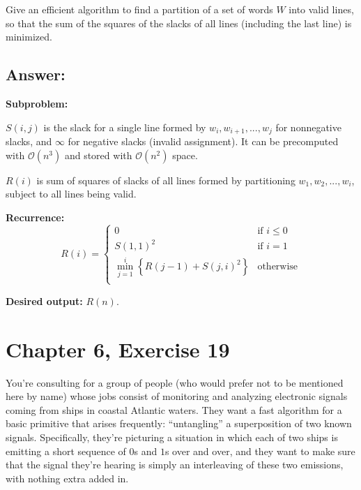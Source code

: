 \documentclass[12pt, letterpaper]{article}
\begin{document}
Give an efficient algorithm to find a partition of a set of words $W$ into valid lines, so that the sum of the squares of the slacks of all lines (including the last line) is minimized.


\subsection*{Answer:}
\vspace{5mm}
\noindent\textbf{Subproblem:}

\noindent$S(i, j)$ is the slack for a single line formed by $w_i, w_{i+1}, ..., w_j$ for nonnegative slacks, and $\infty$ for negative slacks (invalid assignment).
It can be precomputed with $\mathcal{O}(n^3)$ and stored with $\mathcal{O}(n^2)$ space.

\noindent$R(i)$ is sum of squares of slacks of all lines formed by partitioning $w_1, w_2, ..., w_i$, subject to all lines being valid.

\vspace{5mm}
\noindent\textbf{Recurrence:}
\begin{equation*}
    R(i) = 
    \begin{cases}
    0 & \text{if } i \leq 0 \\
    S(1, 1)^2 & \text{if } i = 1 \\
    \min_{j=1}^{i}{\left\{ R(j-1) + S(j, i)^2 \right\}} & \text{otherwise} \\
    \end{cases}
\end{equation*}

\vspace{5mm}
\noindent\textbf{Desired output:}
$R(n)$.

\clearpage
\section{Chapter 6, Exercise 19}
You're consulting for a group of people (who would prefer not to be mentioned here by name) whose jobs consist of monitoring and analyzing electronic signals coming from ships in coastal Atlantic waters. They want a fast algorithm for a basic primitive that arises frequently: ``untangling'' a superposition of two known signals. Specifically, they're picturing a situation in which each of two ships is emitting a short sequence of $0$s and $1$s over and over, and they want to make sure that the signal they're hearing is simply an interleaving of these two emissions, with nothing extra added in.
\end{document}
